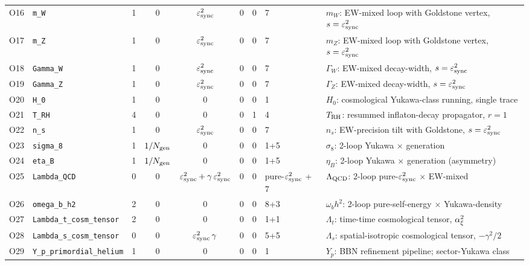 \begin{tabular}{@{}l p{} c c c c c l p{}@{}}
O16 & \texttt{m\_W} & 1 & 0 & $\varepsilon_{\mathrm{sync}}^{2}$ & 0 & 0 & 7 & $m_{W}$: EW-mixed loop with Goldstone vertex, $s=\varepsilon_{\mathrm{sync}}^{2}$ \\
O17 & \texttt{m\_Z} & 1 & 0 & $\varepsilon_{\mathrm{sync}}^{2}$ & 0 & 0 & 7 & $m_{Z}$: EW-mixed loop with Goldstone vertex, $s=\varepsilon_{\mathrm{sync}}^{2}$ \\
O18 & \texttt{Gamma\_W} & 1 & 0 & $\varepsilon_{\mathrm{sync}}^{2}$ & 0 & 0 & 7 & $\Gamma_{W}$: EW-mixed decay-width, $s=\varepsilon_{\mathrm{sync}}^{2}$ \\
O19 & \texttt{Gamma\_Z} & 1 & 0 & $\varepsilon_{\mathrm{sync}}^{2}$ & 0 & 0 & 7 & $\Gamma_{Z}$: EW-mixed decay-width, $s=\varepsilon_{\mathrm{sync}}^{2}$ \\
O20 & \texttt{H\_0} & 1 & 0 & 0 & 0 & 0 & 1 & $H_{0}$: cosmological Yukawa-class running, single trace \\
O21 & \texttt{T\_RH} & 4 & 0 & 0 & 0 & 1 & 4 & $T_{\rm RH}$: resummed inflaton-decay propagator, $r=1$ \\
O22 & \texttt{n\_s} & 1 & 0 & $\varepsilon_{\mathrm{sync}}^{2}$ & 0 & 0 & 7 & $n_{s}$: EW-precision tilt with Goldstone, $s=\varepsilon_{\mathrm{sync}}^{2}$ \\
O23 & \texttt{sigma\_8} & 1 & $1/N_{\mathrm{gen}}$ & 0 & 0 & 0 & 1+5 & $\sigma_{8}$: 2-loop Yukawa $\times$ generation \\
O24 & \texttt{eta\_B} & 1 & $1/N_{\mathrm{gen}}$ & 0 & 0 & 0 & 1+5 & $\eta_{B}$: 2-loop Yukawa $\times$ generation (asymmetry) \\
O25 & \texttt{Lambda\_QCD} & 0 & 0 & $\varepsilon_{\mathrm{sync}}^{2} + \gamma\,\varepsilon_{\mathrm{sync}}^{2}$ & 0 & 0 & pure-$\varepsilon_{\mathrm{sync}}^{2}$ + 7 & $\Lambda_{\rm QCD}$: 2-loop pure-$\varepsilon_{\mathrm{sync}}^{2}$ $\times$ EW-mixed \\
O26 & \texttt{omega\_b\_h2} & 2 & 0 & 0 & 0 & 0 & 8+3 & $\omega_{b}h^{2}$: 2-loop pure-self-energy $\times$ Yukawa-density \\
O27 & \texttt{Lambda\_t\_cosm\_tensor} & 2 & 0 & 0 & 0 & 0 & 1+1 & $\Lambda_{t}$: time-time cosmological tensor, $\alpha_{\xi}^{2}$ \\
O28 & \texttt{Lambda\_s\_cosm\_tensor} & 0 & 0 & $\varepsilon_{\mathrm{sync}}^{2}\,\gamma$ & 0 & 0 & 5+5 & $\Lambda_{s}$: spatial-isotropic cosmological tensor, $-\gamma^{2}/2$ \\
O29 & \texttt{Y\_p\_primordial\_helium} & 1 & 0 & 0 & 0 & 0 & 1 & $Y_{p}$: BBN refinement pipeline; sector-Yukawa class \\
\bottomrule
\end{tabular}
